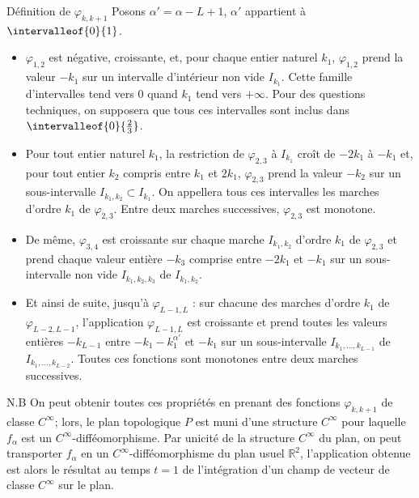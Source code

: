 \documentclass[11pt]{article}
\theoremstyle{definition}
\newenvironment{enonce*}[2][]{\par\medskip\noindent\textbf{#2.}\itshape}{\par\medskip}
\numberwithin{equation}{section}
\numberwithin{figure}{section}
\numberwithin{table}{section}
\newcommand{\bbR}{{\mathbb{R}}}
\begin{document}
\begin{enonce*}{Définition de $\varphi_{k,k+1}$}
Posons $\alpha'=\alpha-L+1$, $\alpha'$ appartient à $\intervalleof{0}{1}$.
\begin{itemize}
\item $\varphi_{1,2}$ est négative, croissante, et, pour chaque entier naturel $k_1$, $\varphi_{1,2}$ prend la valeur $-k_1$ sur un intervalle d'intérieur non vide $I_{k_1}$. Cette famille d'intervalles tend vers $0$ quand $k_1$ tend vers $+\infty$. Pour des questions techniques, on supposera que tous ces intervalles sont inclus dans $\intervalleof{0}{\frac{2}{3}}$.

\item Pour tout entier naturel $k_1$, la restriction de $\varphi_{2,3}$ à $I_{k_1}$ croît de $-2k_1$ à $-k_1$ et, pour tout entier {$k_2$ compris entre $k_1$ et $2k_1$}, $\varphi_{2,3}$ prend la valeur $-k_2$ sur un sous-intervalle $I_{k_1,k_2} \subset I_{k_1}$. On appellera tous ces intervalles les marches d'ordre $k_1$ de $\varphi_{2,3}$. Entre deux marches successives, $\varphi_{2,3}$ est monotone.

\item De même, $\varphi_{3,4}$ est croissante sur chaque marche $I_{k_1,k_2}$ d'ordre $k_1$ de $\varphi_{2,3}$ et {prend chaque valeur entière} $-k_3$ comprise entre $-2k_1$ et $-k_1$ sur un sous-intervalle non vide $I_{k_1,k_2,k_3}$ de $I_{k_1,k_2}$.

\item Et ainsi de suite, jusqu'à $\varphi_{L-1,L}$ : sur chacune des marches d'ordre $k_1$ de $\varphi_{L-2,L-1}$, l'application $\varphi_{L-1,L}$ est croissante et prend toutes les valeurs entières $-k_{L-1}$ entre $-k_1-k_1^{\alpha'}$ et $-k_1$ sur un sous-intervalle $I_{k_1,\dots, k_{L-1}}$ de $I_{k_1,\dots, k_{L-2}}$. Toutes ces fonctions sont monotones entre deux marches successives.
\end{itemize}
\end{enonce*}

\begin{enonce*}[remark]{N.B}
On peut obtenir toutes ces propriétés en prenant des fonctions $\varphi_{k,k+1}$ de classe $C^\infty$; lors, le plan topologique $P$ est muni d'une structure $C^\infty$ pour laquelle $f_\alpha$ est un $C^\infty$-difféomorphisme. Par unicité de la structure $C^\infty$ du plan, on peut transporter $f_\alpha$ en un $C^\infty$-difféomorphisme du plan usuel $\bbR^2$, l'application obtenue est alors le résultat au temps $t=1$ de l'intégration d'un champ de vecteur de classe $C^\infty$ sur le plan.
\end{enonce*}
\end{document}
